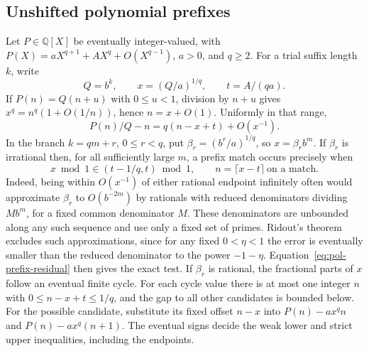 \documentclass[11pt,reqno,a4paper]{amsart}
\theoremstyle{remark}
\begin{document}
\subsection{Unshifted polynomial prefixes}\label{subsec:polynomial-prefixes}

Let \(P\in\mathbb Q[X]\) be eventually integer-valued, with
\(P(X)=aX^{q+1}+A X^q+O(X^{q-1})\), \(a>0\), and \(q\ge2\).
For a trial suffix length \(k\), write
\[
 Q=b^k,\qquad x=(Q/a)^{1/q},\qquad t=A/(qa).
\]
If \(P(n)=Q(n+u)\) with \(0\le u<1\), division by \(n+u\)
gives \(x^q=n^q(1+O(1/n))\), hence \(n=x+O(1)\).
Uniformly in that range,
\begin{equation}\label{eq:pol-prefix-residual}
 P(n)/Q-n=q(n-x+t)+O(x^{-1}).
\end{equation}
In the branch \(k=qm+r\), \(0\le r<q\), put
\(\beta_r=(b^r/a)^{1/q}\), so \(x=\beta_r b^m\). If \(\beta_r\)
is irrational then, for all sufficiently large \(m\), a prefix
match occurs precisely when
\begin{equation}\label{eq:pol-irrational-arc}
 x\bmod 1\in (t-1/q,t)\bmod 1,
 \qquad n=\lceil x-t\rceil\ \text{on a match}.
\end{equation}
Indeed, being within \(O(x^{-1})\) of either rational endpoint
infinitely often would approximate \(\beta_r\) to
\(O(b^{-2m})\) by rationals with reduced denominators dividing
\(M b^m\), for a fixed common denominator \(M\).
These denominators are unbounded along any such sequence and use
only a fixed set of primes. Ridout's theorem~\cite{pol-ridout}
excludes such approximations, since for any fixed \(0<\eta<1\)
the error is eventually smaller than the reduced denominator
to the power \(-1-\eta\). Equation~\eqref{eq:pol-prefix-residual}
then gives the exact test. If \(\beta_r\) is rational, the
fractional parts of \(x\) follow an eventual finite cycle. For
each cycle value there is at most one integer \(n\) with
\(0\le n-x+t\le1/q\), and the gap to all other candidates is
bounded below. For the possible candidate, substitute its fixed
offset \(n-x\) into \(P(n)-a x^q n\) and \(P(n)-a x^q(n+1)\).
The eventual signs decide the weak lower and strict upper
inequalities, including the endpoints.
\end{document}
